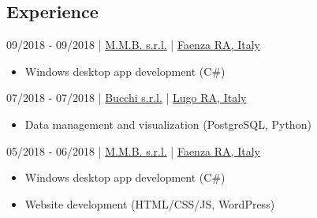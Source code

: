 \documentclass{article}
\begin{document}
\begin{paracol}{2}
%
%

\vfill

\center

\section*{ Experience}

\begin{tcolorbox}[title=\emoji{man-technologist} Software Developer PCTO (work/school),colback=white]
     09/2018 - 09/2018 \hfill | \hfill
    \href{https://www.mmbsoftware.it/portalemmb/en/home}{ M.M.B. s.r.l.} \hfill | \hfill
    \href{https://www.openstreetmap.org/node/1864397767}{ Faenza RA, Italy}

    \tcblower

    \begin{itemize}
        \item {} Windows desktop app development (C\#)
    \end{itemize}
\end{tcolorbox}

\begin{tcolorbox}[title=\emoji{man-technologist} Software Developer Internship,colback=white]
     07/2018 - 07/2018 \hfill | \hfill
    \href{http://www.bucchi.it/en/}{ Bucchi s.r.l.} \hfill | \hfill
    \href{https://www.openstreetmap.org/node/4752486846}{ Lugo RA, Italy}

    \tcblower

    \begin{itemize}
        \item {} Data management and visualization (PostgreSQL, Python)
    \end{itemize}
\end{tcolorbox}

\begin{tcolorbox}[title=\emoji{man-technologist} Software Developer PCTO (work/school),colback=white]
     05/2018 - 06/2018 \hfill | \hfill
    \href{https://www.mmbsoftware.it/portalemmb/en/home}{ M.M.B. s.r.l.} \hfill | \hfill
    \href{https://www.openstreetmap.org/node/1864397767}{ Faenza RA, Italy}

    \tcblower

    \begin{itemize}
        \item {} Windows desktop app development (C\#)
        \item {} Website development (HTML/CSS/JS, WordPress)
    \end{itemize}
\end{tcolorbox}


\end{paracol}
\end{document}

